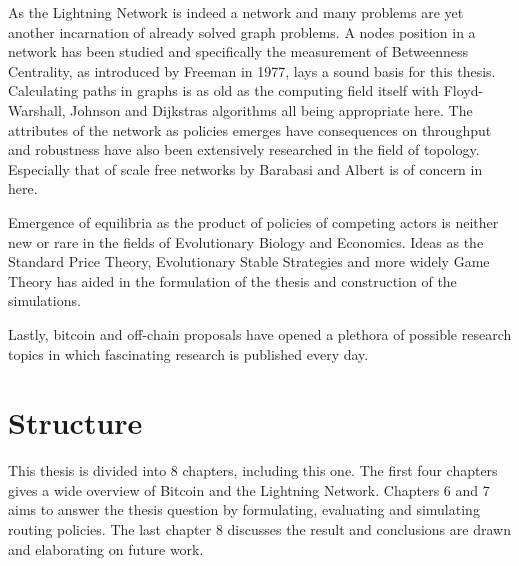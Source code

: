 	As the Lightning Network is indeed a network and many problems are yet another incarnation of already solved graph problems. A nodes position in a network has been studied and specifically the measurement of Betweenness Centrality, as introduced by Freeman in 1977\cite{brandes:betweenness:centrality:algorithm}, lays a sound basis for this thesis. Calculating paths in graphs is as old as the computing field itself with Floyd-Warshall, Johnson\cite{johnson:shortest:path:sparse:network} and Dijkstras algorithms all being appropriate here. The attributes of the network as policies emerges have consequences on throughput and robustness have also been extensively researched in the field of topology. Especially that of scale free networks by Barabasi and Albert\cite{barabasi:albert:emergent:scaling} is of concern in here.
	
	Emergence of equilibria as the product of policies of competing actors is neither new or rare in the fields of Evolutionary Biology and Economics. Ideas as the Standard Price Theory, Evolutionary Stable Strategies and more widely Game Theory has aided in the formulation of the thesis and construction of the simulations.
	
	Lastly, bitcoin and off-chain proposals have opened a plethora of possible research topics in which fascinating research is published every day.  
	
	
\section{Structure}

This thesis is divided into 8 chapters, including this one. The first four chapters gives a wide overview of Bitcoin and the Lightning Network. Chapters 6 and 7 aims to answer the thesis question by formulating, evaluating and simulating routing policies. The last chapter 8 discusses the result and conclusions are drawn and elaborating on future work.

